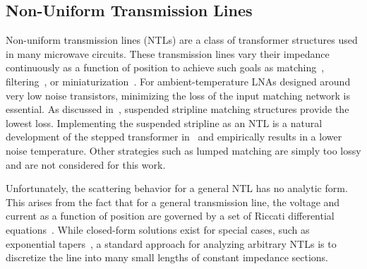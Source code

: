 \subsection{Non-Uniform Transmission Lines}

Non-uniform transmission lines (NTLs) are a class of transformer structures used in many microwave circuits.
These transmission lines vary their impedance continuously as a function of position to achieve such goals as matching~\cite{xiaoImpedanceMatchingComplex2002}, filtering~\cite{panArbitraryFilterDesign1999}, or miniaturization~\cite{khalaj-amirhosseiniNonuniformTransmissionLines2008}.
For ambient-temperature LNAs designed around very low noise transistors, minimizing the loss of the input matching network is essential.
As discussed in~\cite{weinrebLowNoiseAmplifier2021}, suspended stripline matching structures provide the lowest loss.
Implementing the suspended stripline as an NTL is a natural development of the stepped transformer in~\cite{shiRoomTemperatureLowNoiseAmplifier2023} and empirically results in a lower noise temperature.
Other strategies such as lumped matching are simply too lossy and are not considered for this work.

Unfortunately, the scattering behavior for a general NTL has no analytic form.
This arises from the fact that for a general transmission line, the voltage and current as a function of position are governed by a set of Riccati differential equations~\cite{sugaiRiccatiBernoulliEquations1961}.
While closed-form solutions exist for special cases, such as exponential tapers~\cite{wheelerTransmissionLinesExponential1939}, a standard approach for analyzing arbitrary NTLs is to discretize the line into many small lengths of constant impedance sections.

